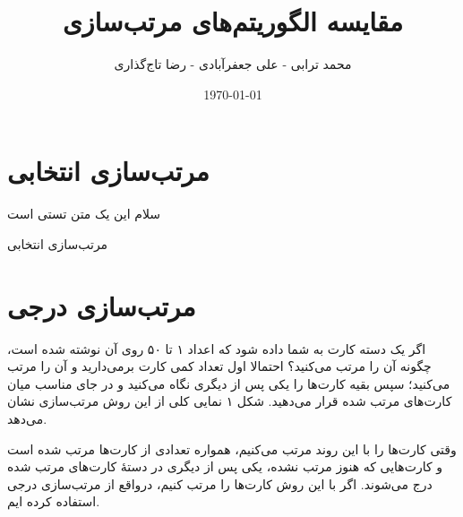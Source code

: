 \documentclass[12pt]{article}
\title{مقایسه الگوریتم‌های مرتب‌سازی}
\author{محمد ترابی - علی جعفر‌آبادی - رضا تاج‌گذاری}
\date{\today}
\makeatletter
\def\BState{\State\hskip-\ALG@thistlm}
\makeatother
\begin{document}
\maketitle

\section{مرتب‌سازی انتخابی}

سلام این یک متن تستی است


\begin{algorithm}
  \caption{مرتب‌سازی انتخابی}\label{euclid}
  \begin{latin}
  \end{latin}
\end{algorithm}

\section{مرتب‌سازی درجی}

اگر یک دسته کارت به شما داده شود که اعداد ۱ تا ۵۰ روی آن نوشته شده است، چگونه آن را مرتب می‌کنید؟
احتمالا اول تعداد کمی کارت برمی‌دارید و آن را مرتب می‌کنید؛
سپس بقیه کارت‌ها را یکی پس از دیگری نگاه می‌کنید
و در جای مناسب میان کارت‌های مرتب شده قرار می‌دهید.
شکل ۱ نمایی کلی از این روش مرتب‌سازی نشان می‌دهد.


وقتی کارت‌ها را با این روند مرتب می‌کنیم، همواره تعدادی از کارت‌ها مرتب شده است و کارت‌هایی که هنوز مرتب نشده، یکی پس از دیگری
در دستهٔ کارت‌های مرتب شده درج می‌شوند.
اگر با این روش کارت‌ها را مرتب کنیم، درواقع از مرتب‌سازی درجی استفاده کرده ایم.
\end{document}
